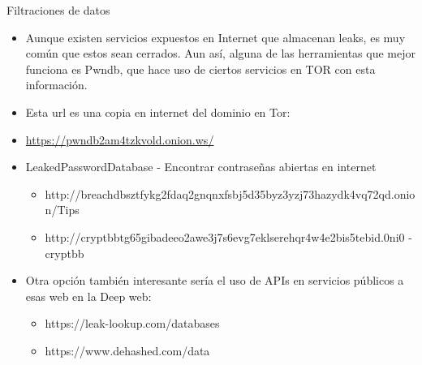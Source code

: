 \documentclass[aspectratio=169,11pt]{beamer}
\begin{document}
\begin{frame}[allowframebreaks]{Filtraciones de datos}
\small
  \begin{itemize}
  \item Aunque existen servicios expuestos en Internet que almacenan leaks, es muy común que estos sean cerrados. Aun así, alguna de las herramientas que mejor funciona es Pwndb, que hace uso de ciertos servicios en TOR con esta información. 
  \item Esta url es una copia en internet del dominio en Tor:
  \item \href{https://pwndb2am4tzkvold.onion.ws/}{https://pwndb2am4tzkvold.onion.ws/}
  \item LeakedPasswordDatabase - Encontrar contraseñas abiertas en internet
   \begin{itemize}

  \item http://breachdbsztfykg2fdaq2gnqnxfsbj5d35byz3yzj73hazydk4vq72qd.onion/Tips
  \item http://cryptbbtg65gibadeeo2awe3j7s6evg7eklserehqr4w4e2bis5tebid.0ni0 - cryptbb
\end{itemize}
  \item Otra opción también interesante sería el uso de APIs en servicios públicos a esas web en la Deep web:
  \begin{itemize}

  \item https://leak-lookup.com/databases
  \item https://www.dehashed.com/data
\end{itemize}
  \end{itemize}
\end{frame}
\end{document}
